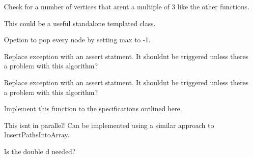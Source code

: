 \begin{DoxyRefList}
Check for a number of vertices that aren\textquotesingle{}t a multiple of 3 like the other functions.  
\item[Class \mbox{\hyperlink{a01315}{HF\+::Graph\+Generator\+::Unique\+Queue}} ]\label{a00452__todo000001}%
%
This could be a useful standalone templated class.  
\item[Member \mbox{\hyperlink{a01315_ae941f357ddbefc3b670c43ce2d90b589}{HF\+::Graph\+Generator\+::Unique\+Queue\+::pop\+Many}} (int max=-\/1)]\label{a00452__todo000002}%
%
Opetion to pop every node by setting max to -\/1. 
\item[Member \mbox{\hyperlink{a00472_a977e4c93a977ab4e9e784d1e6fec79f4}{HF\+::Pathfinding\+::Construct\+Shortest\+Path\+From\+Pred}} (int start, int end, const std\+::vector$<$ size\+\_\+t $>$ \&pred, const std\+::vector$<$ float $>$ \&distances)]\label{a00452__todo000017}%
%
Replace exception with an assert statment. It shouldn\textquotesingle{}t be triggered unless there\textquotesingle{}s a problem with this algorithm?  
\item[Member \mbox{\hyperlink{a00472_a3d6e0ea77f750fa05bbf4339584cc15a}{HF\+::Pathfinding\+::Construct\+Shortest\+Path\+Nodes\+From\+Pred}} (int start, int end, const std\+::vector$<$ size\+\_\+t $>$ \&pred)]\label{a00452__todo000018}%
%
Replace exception with an assert statment. It shouldn\textquotesingle{}t be triggered unless there\textquotesingle{}s a problem with this algorithm?  
\item[Member \mbox{\hyperlink{a00472_abb65ba6c3ed7a1999d9f40ae14ba3269}{HF\+::Pathfinding\+::Find\+All\+Paths}} (\mbox{\hyperlink{a01383}{Boost\+Graph}} $\ast$bg)]\label{a00452__todo000020}%
%
Implement this function to the specifications outlined here.  
\item[Member \mbox{\hyperlink{a00472_a15badb9d0a17849de7b21105605c9c91}{HF\+::Pathfinding\+::Find\+Paths}} (\mbox{\hyperlink{a01383}{Boost\+Graph}} $\ast$bg, const std\+::vector$<$ int $>$ \&start\+\_\+points, const std\+::vector$<$ int $>$ \&end\+\_\+points)]\label{a00452__todo000019}%
%
This isn\textquotesingle{}t in parallel! Can be implemented using a similar approach to Insert\+Paths\+Into\+Array.  
\item[Class \mbox{\hyperlink{a00472}{HF\+::Pathfinding\+::vertex\+\_\+data}} ]\label{a00452__todo000016}%
%
Is the double d needed? 

\end{DoxyRefList}
